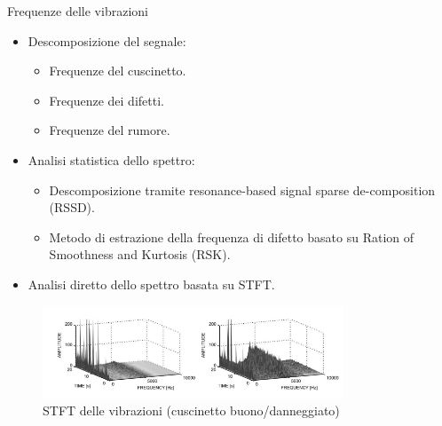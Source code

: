 \documentclass{beamer}
\begin{document}
\begin{frame}[allowframebreaks]{Frequenze delle vibrazioni}
    \begin{itemize}
        \item Descomposizione del segnale\cite{tang2019fault}:
        \begin{itemize}
            \item Frequenze del cuscinetto.
            \item Frequenze dei difetti.
            \item Frequenze del rumore.
        \end{itemize}
        \item Analisi statistica dello spettro\cite{xue2022fault}:
        \begin{itemize}
            \item Descomposizione tramite resonance-based signal sparse de-composition (RSSD).
            \item Metodo di estrazione della frequenza di difetto basato su Ration of Smoothness and Kurtosis (RSK).
        \end{itemize}
        \framebreak
        \item Analisi diretto dello spettro basata su STFT\cite{rubio2012experimental}.
    \end{itemize}
    
    \begin{figure}
        \centering
        \includegraphics[width=0.8\textwidth]{Figures/STFT.png}
        \caption{STFT delle vibrazioni (cuscinetto buono/danneggiato)}
        \label{fig:STFT}
    \end{figure}
\end{frame}
\end{document}
